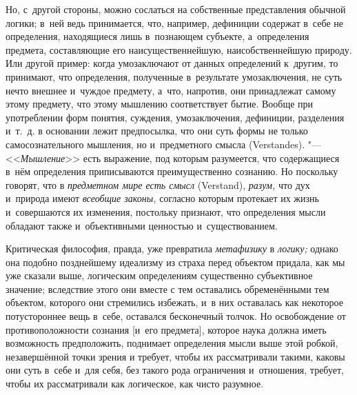 Но, с~другой стороны, можно сослаться на собственные представления обычной
логики; в~ней ведь принимается, что, например, дефиниции содержат в~себе не
определения, находящиеся лишь в~познающем субъекте, а~определения предмета,
составляющие его наисущественнейшую, наисобственнейшую природу. Или другой
пример: когда умозаключают от данных определений к~другим, то принимают,
что определения, полученные в~результате умозаключения, не суть нечто
внешнее и~чуждое предмету, а~что, напротив, они принадлежат самому этому
предмету, что этому мышлению соответствует бытие. Вообще при употреблении
форм понятия, суждения, умозаключения, дефиниции, разделения и~т.~д. в
основании лежит предпосылка, что они суть формы не только самосознательного
мышления, но и~предметного смысла (Verstandes). "---
<<{\em Мышление}>> есть выражение, под которым
разумеется, что содержащиеся в~нём определения приписываются
преимущественно сознанию. Но поскольку говорят, что в
{\em предметном мире есть смысл} (Verstand),
{\em разум,} что дух и~природа имеют
{\em всеобщие законы,} согласно которым протекает их
жизнь и~совершаются их изменения, постольку признают, что определения мысли
обладают также и~объективными ценностью и~существованием.

Критическая философия, правда, уже превратила
{\em метафизику} в {\em логику;}
однако она подобно позднейшему
идеализму
из страха перед объектом придала, как мы уже сказали выше, логическим
определениям существенно субъективное значение; вследствие этого они вместе
с тем оставались обременёнными тем объектом, которого они стремились
избежать, и~в них оставалась как некоторое потустороннее вещь в~себе,
оставался бесконечный толчок. Но освобождение от противоположности сознания
[и~его предмета], которое наука должна иметь возможность предположить,
поднимает определения мысли выше этой робкой, незавершённой точки зрения и
требует, чтобы их рассматривали такими, каковы они суть в~себе и~для себя,
без такого рода ограничения и~отношения, требует, чтобы их рассматривали
как логическое, как чисто разумное.

